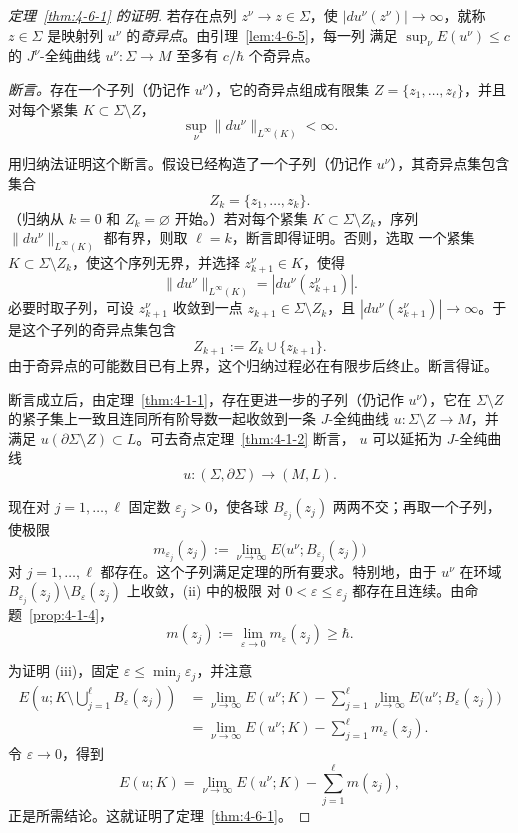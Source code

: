 \begin{proof}[定理~\ref{thm:4-6-1} 的证明]
若存在点列 $z^\nu\to z\in\Sigma$，使 $|du^\nu(z^\nu)|\to\infty$，就称
$z\in\Sigma$ 是映射列 $u^\nu$ 的\emph{奇异点}。由引理~\ref{lem:4-6-5}，每一列
满足 $\sup_\nu E(u^\nu)\le c$ 的 $J^\nu$-全纯曲线
$u^\nu:\Sigma\to M$ 至多有 $c/\hbar$ 个奇异点。

\emph{断言。}存在一个子列（仍记作 $u^\nu$），它的奇异点组成有限集
$Z=\{z_1,\ldots,z_\ell\}$，并且对每个紧集 $K\subset\Sigma\setminus Z$，
\[
  \sup_\nu\lVert du^\nu\rVert_{L^\infty(K)}<\infty.
\]

用归纳法证明这个断言。假设已经构造了一个子列（仍记作 $u^\nu$），其奇异点集包含
集合
\[
  Z_k=\{z_1,\ldots,z_k\}.
\]
（归纳从 $k=0$ 和 $Z_k=\varnothing$ 开始。）若对每个紧集
$K\subset\Sigma\setminus Z_k$，序列
$\lVert du^\nu\rVert_{L^\infty(K)}$ 都有界，则取 $\ell=k$，断言即得证明。否则，选取
一个紧集 $K\subset\Sigma\setminus Z_k$，使这个序列无界，并选择
$z_{k+1}^\nu\in K$，使得
\[
  \lVert du^\nu\rVert_{L^\infty(K)}
  =|du^\nu(z_{k+1}^\nu)|.
\]
必要时取子列，可设 $z_{k+1}^\nu$ 收敛到一点
$z_{k+1}\in\Sigma\setminus Z_k$，且
$|du^\nu(z_{k+1}^\nu)|\to\infty$。于是这个子列的奇异点集包含
\[
  Z_{k+1}:=Z_k\cup\{z_{k+1}\}.
\]
由于奇异点的可能数目已有上界，这个归纳过程必在有限步后终止。断言得证。

断言成立后，由定理~\ref{thm:4-1-1}，存在更进一步的子列（仍记作 $u^\nu$），它在
$\Sigma\setminus Z$ 的紧子集上一致且连同所有阶导数一起收敛到一条 $J$-全纯曲线
$u:\Sigma\setminus Z\to M$，并满足
$u(\partial\Sigma\setminus Z)\subset L$。可去奇点定理~\ref{thm:4-1-2} 断言，
$u$ 可以延拓为 $J$-全纯曲线
\[
  u:(\Sigma,\partial\Sigma)\longrightarrow(M,L).
\]

现在对 $j=1,\ldots,\ell$ 固定数 $\varepsilon_j>0$，使各球
$B_{\varepsilon_j}(z_j)$ 两两不交；再取一个子列，使极限
\[
  m_{\varepsilon_j}(z_j)
  :=\lim_{\nu\to\infty}
  E\bigl(u^\nu;B_{\varepsilon_j}(z_j)\bigr)
\]
对 $j=1,\ldots,\ell$ 都存在。这个子列满足定理的所有要求。特别地，由于 $u^\nu$
在环域 $B_{\varepsilon_j}(z_j)\setminus B_\varepsilon(z_j)$ 上收敛，(ii) 中的极限
对 $0<\varepsilon\le\varepsilon_j$ 都存在且连续。由命题~\ref{prop:4-1-4}，
\[
  m(z_j):=\lim_{\varepsilon\to0}m_\varepsilon(z_j)\ge\hbar.
\]

为证明 (iii)，固定 $\varepsilon\le\min_j\varepsilon_j$，并注意
\[
  \begin{aligned}
  E\left(u;K\setminus\bigcup_{j=1}^\ell B_\varepsilon(z_j)\right)
  &=\lim_{\nu\to\infty}E(u^\nu;K)
    -\sum_{j=1}^\ell\lim_{\nu\to\infty}
      E\bigl(u^\nu;B_\varepsilon(z_j)\bigr)\\
  &=\lim_{\nu\to\infty}E(u^\nu;K)
    -\sum_{j=1}^\ell m_\varepsilon(z_j).
  \end{aligned}
\]
令 $\varepsilon\to0$，得到
\[
  E(u;K)=\lim_{\nu\to\infty}E(u^\nu;K)
  -\sum_{j=1}^\ell m(z_j),
\]
正是所需结论。这就证明了定理~\ref{thm:4-6-1}。
\end{proof}

